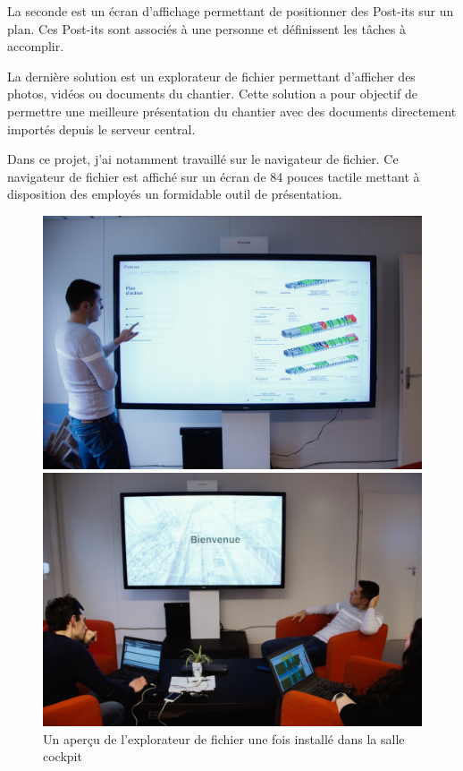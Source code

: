 La seconde est un écran d'affichage permettant de positionner des Post-its sur un plan.
Ces Post-its sont associés à une personne et définissent les tâches à accomplir.

La dernière solution est un explorateur de fichier permettant d'afficher des photos, vidéos ou documents du chantier.
Cette solution a pour objectif de permettre une meilleure présentation du chantier avec des documents directement importés depuis le serveur central.

\medskip

Dans ce projet, j'ai notamment travaillé sur le navigateur de fichier.
Ce navigateur de fichier est affiché sur un écran de 84 pouces tactile mettant à disposition des employés un formidable outil de présentation.

\begin{figure}[h]
    \centering
    \includegraphics[scale=1.2]{img/media-reader-pres-1.jpg}

    \bigskip

    \includegraphics[scale=1.2]{img/media-reader-pres-2.jpg}
    \caption{Un aperçu de l'explorateur de fichier une fois installé dans la salle cockpit}
\end{figure}

